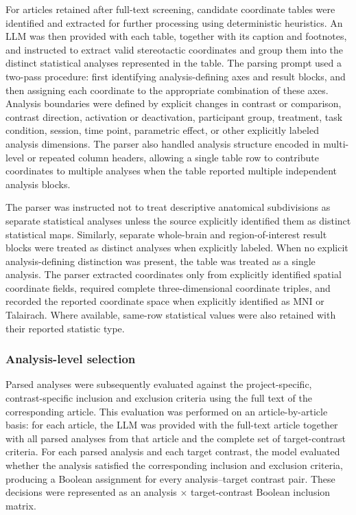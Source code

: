 For articles retained after full-text screening, candidate coordinate tables were identified and extracted for further processing using deterministic heuristics. An LLM was then provided with each table, together with its caption and footnotes, and instructed to extract valid stereotactic coordinates and group them into the distinct statistical analyses represented in the table. The parsing prompt used a two-pass procedure: first identifying analysis-defining axes and result blocks, and then assigning each coordinate to the appropriate combination of these axes. Analysis boundaries were defined by explicit changes in contrast or comparison, contrast direction, activation or deactivation, participant group, treatment, task condition, session, time point, parametric effect, or other explicitly labeled analysis dimensions. The parser also handled analysis structure encoded in multi-level or repeated column headers, allowing a single table row to contribute coordinates to multiple analyses when the table reported multiple independent analysis blocks.

The parser was instructed not to treat descriptive anatomical subdivisions as separate statistical analyses unless the source explicitly identified them as distinct statistical maps. Similarly, separate whole-brain and region-of-interest result blocks were treated as distinct analyses when explicitly labeled. When no explicit analysis-defining distinction was present, the table was treated as a single analysis. The parser extracted coordinates only from explicitly identified spatial coordinate fields, required complete three-dimensional coordinate triples, and recorded the reported coordinate space when explicitly identified as MNI or Talairach. Where available, same-row statistical values were also retained with their reported statistic type.

\subsubsection{Analysis-level selection}

Parsed analyses were subsequently evaluated against the project-specific, contrast-specific inclusion and exclusion criteria using the full text of the corresponding article. This evaluation was performed on an article-by-article basis: for each article, the LLM was provided with the full-text article together with all parsed analyses from that article and the complete set of target-contrast criteria. For each parsed analysis and each target contrast, the model evaluated whether the analysis satisfied the corresponding inclusion and exclusion criteria, producing a Boolean assignment for every analysis--target contrast pair. These decisions were represented as an analysis $\times$ target-contrast Boolean inclusion matrix.

